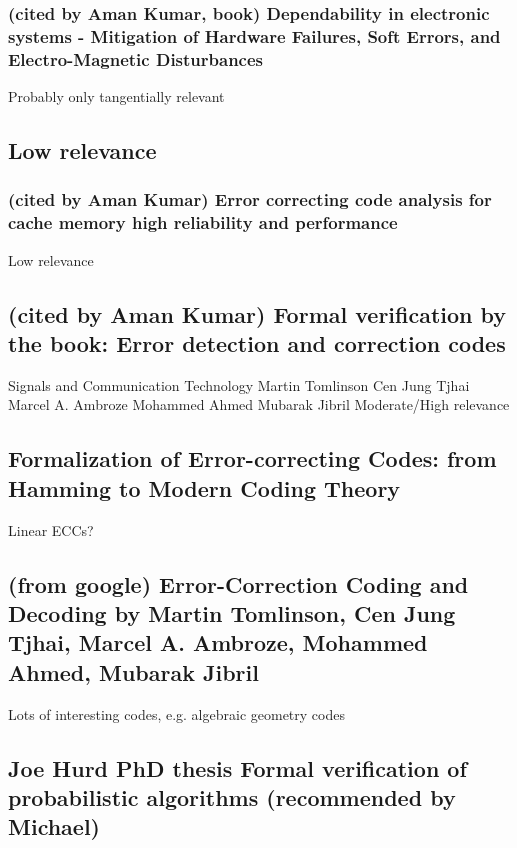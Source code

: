 \documentclass{article}
\begin{document}
\subsubsection{(cited by Aman Kumar, book) Dependability in electronic systems - Mitigation of Hardware Failures, Soft Errors, and Electro-Magnetic Disturbances}

Probably only tangentially relevant


\subsection{Low relevance}

\subsubsection{(cited by Aman Kumar) Error correcting code analysis for cache memory high reliability and performance}

Low relevance


\subsection{(cited by Aman Kumar) Formal verification by the book: Error detection and correction codes}
Signals and Communication Technology
Martin Tomlinson
Cen Jung Tjhai
Marcel A. Ambroze
Mohammed Ahmed
Mubarak Jibril
Moderate/High relevance

\subsection{Formalization of Error-correcting Codes: from Hamming to Modern Coding Theory}

Linear ECCs?

\subsection {(from google) Error-Correction Coding and Decoding by Martin Tomlinson, Cen Jung Tjhai, Marcel A. Ambroze, Mohammed Ahmed, Mubarak Jibril}

Lots of interesting codes, e.g. algebraic geometry codes

\subsection {Joe Hurd PhD thesis Formal verification of probabilistic
algorithms (recommended by Michael)}
\end{document}

